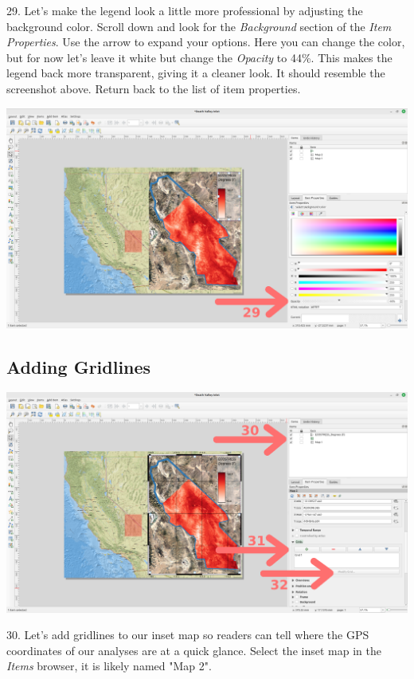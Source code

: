 \documentclass[oneside,a4paper,11pt,explicit]{book}
\begin{document}
29. Let's make the legend look a little more professional by adjusting the background color. Scroll down and look for the \textit{Background} section of the \textit{Item Properties}. Use the arrow to expand your options. Here you can change the color, but for now let's leave it white but change the \textit{Opacity} to 44\%. This makes the legend back more transparent, giving it a cleaner look. It should resemble the screenshot above. Return back to the list of item properties.

\centerline{\includegraphics[width=\textwidth]{TempLegend2.png}}


\subsection{Adding Gridlines}

\centerline{\includegraphics[width=\textwidth]{AddGrid.png}}

30. Let's add gridlines to our inset map so readers can tell where the GPS coordinates of our analyses are at a quick glance. Select the inset map in the \textit{Items} browser, it is likely named "Map 2".
\end{document}
